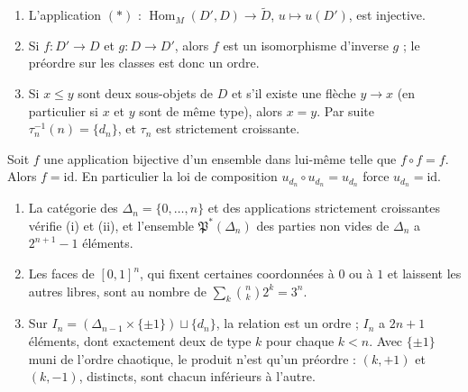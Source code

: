 \begin{enonce}[Pages 6 et 7]\leavevmode
\begin{enumerate}
\item L'application $(*)$ : $\operatorname{Hom}_M(D', D) \to \widetilde D$, $u \mapsto u(D')$, est injective.
\item Si $f : D' \to D$ et $g : D \to D'$, alors $f$ est un isomorphisme d'inverse $g$ ; le préordre sur les classes est donc un ordre.
\item Si $x \leq y$ sont deux sous-objets de $D$ et s'il existe une flèche $y \to x$ (en particulier si $x$ et $y$ sont de même type), alors $x = y$. Par suite $\tau_n^{-1}(n) = \{d_n\}$, et $\tau_n$ est strictement croissante.
\end{enumerate}
\end{enonce}

\begin{enonce}
Soit $f$ une application bijective d'un ensemble dans lui-même telle que $f \circ f = f$. Alors $f = \mathrm{id}$. En particulier la loi de composition $u_{d_n} \circ u_{d_n} = u_{d_n}$ force $u_{d_n} = \mathrm{id}$.
\end{enonce}

\begin{enonce}\leavevmode
\begin{enumerate}
\item La catégorie des $\Delta_n = \{0, \dots, n\}$ et des applications strictement croissantes vérifie (i) et (ii), et l'ensemble $\mathfrak P^*(\Delta_n)$ des parties non vides de $\Delta_n$ a $2^{n+1} - 1$ éléments.
\item Les faces de $[0,1]^n$, qui fixent certaines coordonnées à $0$ ou à $1$ et laissent les autres libres, sont au nombre de $\sum_{k} \binom nk 2^k = 3^n$.
\item Sur $I_n = (\Delta_{n-1} \times \{\pm 1\}) \sqcup \{d_n\}$, la relation  est un ordre ; $I_n$ a $2n + 1$ éléments, dont exactement deux de type $k$ pour chaque $k < n$. Avec $\{\pm 1\}$ muni de l'ordre chaotique, le produit n'est qu'un préordre : $(k, +1)$ et $(k, -1)$, distincts, sont chacun inférieurs à l'autre.
\end{enumerate}
\end{enonce}

